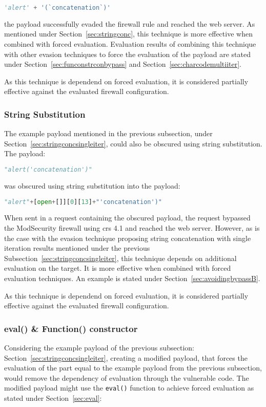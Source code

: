 \begin{lstlisting}[style=basicStyle, language=Python, caption='alert' + '(`concatenation`)' bypass, label={lst:strconcbypass}]
'alert' + '(`concatenation`)'
\end{lstlisting}
the payload successfully evaded the firewall rule and reached the web server. As mentioned under Section~\ref{sec:stringconc}, this technique is more effective when combined with forced evaluation. Evaluation results of combining this technique with other evasion techniques to force the evaluation of the payload are stated under Section~\ref{sec:funconstrconbypass} and Section~\ref{sec:charcodemultiiter}.

As this technique is dependend on forced evaluation, it is considered partially effective against the evaluated firewall configuration.


\subsubsection{String Substitution}
\label{sec:stringsubsingleiter}
The example payload mentioned in the previous subsection, under Section~\ref{sec:stringconcsingleiter}, could also be obscured using string substitution. The payload:

\begin{lstlisting}[style=basicStyle, language=Python]
"alert('concatenation')"
\end{lstlisting}
was obscured using string substitution into the payload:

\begin{lstlisting}[style=basicStyle, language=Python]
"alert"+[open+[]][0][13]+"'concatenation')"
\end{lstlisting}
When sent in a request containing the obscured payload, the request bypassed the ModSecurity firewall using \acrshort{crs} 4.1 and reached the web server. However, as is the case with the evasion technique proposing string concatenation with single iteration results mentioned under the previous Subsection~\ref{sec:stringconcsingleiter}, this technique depends on additional evaluation on the target. 
It is more effective when combined with forced evaluation techniques. An example is stated under Section~\ref{sec:avoidingbypassB}. 

As this technique is dependend on forced evaluation, it is considered partially effective against the evaluated firewall configuration.


\subsubsection{eval() \& Function() constructor}
\label{sec:functionconstructorsingleeva}
Considering the example payload of the previous subsection: Section~\ref{sec:stringconcsingleiter}, creating a modified payload, that forces the evaluation of the part equal to the example payload from the previous subsection, would remove the dependency of evaluation through the vulnerable code. The modified payload might use the \verb|eval()| function to achieve forced evaluation as stated under Section~\ref{sec:eval}:

